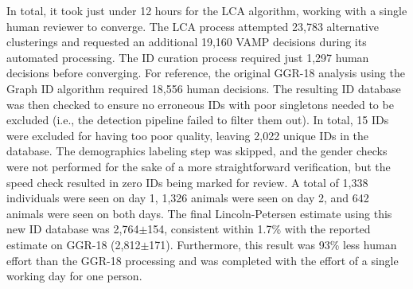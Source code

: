In total, it took just under 12 hours for the LCA algorithm, working with a single human reviewer to converge.  The LCA process attempted 23,783 alternative clusterings and requested an additional 19,160 VAMP decisions during its automated processing.  The ID curation process required just 1,297 human decisions before converging.  For reference, the original GGR-18 analysis using the Graph ID algorithm required 18,556 human decisions.  The resulting ID database was then checked to ensure no erroneous IDs with poor singletons needed to be excluded (i.e., the detection pipeline failed to filter them out).  In total, 15 IDs were excluded for having too poor quality, leaving 2,022 unique IDs in the database.  The demographics labeling step was skipped, and the gender checks were not performed for the sake of a more straightforward verification, but the speed check resulted in zero IDs being marked for review.  A total of 1,338 individuals were seen on day 1, 1,326 animals were seen on day 2, and 642 animals were seen on both days. The final Lincoln-Petersen estimate using this new ID database was 2,764$\pm$154, consistent within 1.7\% with the reported estimate on GGR-18 (2,812$\pm$171).  Furthermore, this result was 93\% less human effort than the GGR-18 processing and was completed with the effort of a single working day for one person.

